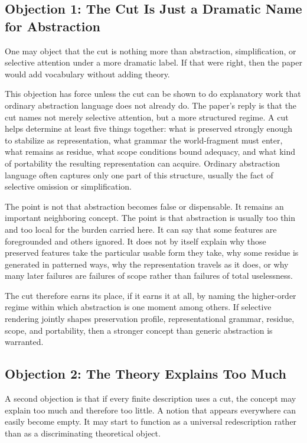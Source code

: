 \documentclass[11pt]{article}
\begin{document}
\subsection{Objection 1: The Cut Is Just a Dramatic Name for Abstraction}

One may object that the cut is nothing more than abstraction, simplification, or selective attention under a more dramatic label. If that were right, then the paper would add vocabulary without adding theory.

This objection has force unless the cut can be shown to do explanatory work that ordinary abstraction language does not already do. The paper's reply is that the cut names not merely selective attention, but a more structured regime. A cut helps determine at least five things together: what is preserved strongly enough to stabilize as representation, what grammar the world-fragment must enter, what remains as residue, what scope conditions bound adequacy, and what kind of portability the resulting representation can acquire. Ordinary abstraction language often captures only one part of this structure, usually the fact of selective omission or simplification.

The point is not that abstraction becomes false or dispensable. It remains an important neighboring concept. The point is that abstraction is usually too thin and too local for the burden carried here. It can say that some features are foregrounded and others ignored. It does not by itself explain why those preserved features take the particular usable form they take, why some residue is generated in patterned ways, why the representation travels as it does, or why many later failures are failures of scope rather than failures of total uselessness.

The cut therefore earns its place, if it earns it at all, by naming the higher-order regime within which abstraction is one moment among others. If selective rendering jointly shapes preservation profile, representational grammar, residue, scope, and portability, then a stronger concept than generic abstraction is warranted.

\subsection{Objection 2: The Theory Explains Too Much}

A second objection is that if every finite description uses a cut, the concept may explain too much and therefore too little. A notion that appears everywhere can easily become empty. It may start to function as a universal redescription rather than as a discriminating theoretical object.
\end{document}

